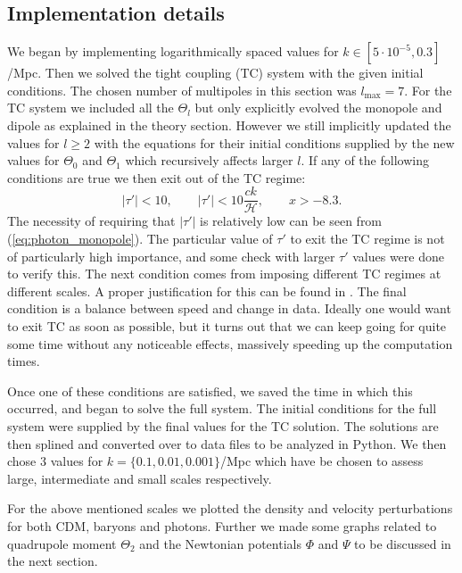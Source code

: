 \documentclass[%
reprint,
 amsmath,amssymb,
 aps,
]{revtex4-2}
\newcommand{\Hp}{\mathcal{H}}
\begin{document}
\subsection{Implementation details}
We began by implementing logarithmically spaced values for $k\in[5\cdot10^{-5},0.3]$/Mpc. Then we solved the tight coupling (TC) system with the given initial conditions. The chosen number of multipoles in this section was $l_\text{max}=7$. For the TC system we included all the $\Theta_l$ but only explicitly evolved the monopole and dipole as explained in the theory section. However we still implicitly updated the values for $l\geq2$ with the equations for their initial conditions supplied by the new values for $\Theta_0$ and $\Theta_1$ which recursively affects larger $l$. If any of the following conditions are true we then exit out of the TC regime:
\[|\tau'|<10,\quad\quad|\tau'|<10\frac{ck}{\Hp},\quad\quad x>-8.3.\]
 The necessity of requiring that $|\tau'|$ is relatively low can be seen from (\ref{eq:photon_monopole}). The particular value of $\tau'$ to exit the TC regime is not of particularly high importance, and some check with larger $\tau'$ values were done to verify this. The next condition comes from imposing different TC regimes at different scales. A proper justification for this can be found in \cite{Doran:2005ep}. The final condition is a balance between speed and change in data. Ideally one would want to exit TC as soon as possible, but it turns out that we can keep going for quite some time without any noticeable effects, massively speeding up the computation times. 
 
Once one of these conditions are satisfied, we saved the time in which this occurred, and began to solve the full system. The initial conditions for the full system were supplied by the final values for the TC solution. The solutions are then splined and converted over to data files to be analyzed in Python. We then chose 3 values for $k=\{0.1,0.01,0.001\}$/Mpc which have be chosen to assess large, intermediate and small scales respectively.
 
 For the above mentioned scales we plotted the density and velocity perturbations for both CDM, baryons and photons. Further we made some graphs related to quadrupole moment $\Theta_2$ and the Newtonian potentials $\Phi$ and $\Psi$ to be discussed in the next section. 
\end{document}
